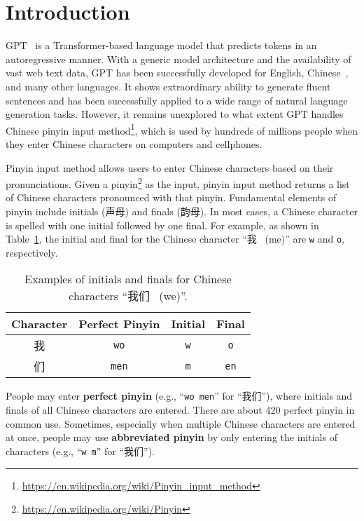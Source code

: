 \vspace{0.01cm}
\section{Introduction}
\label{sec:intro}
GPT~\cite{radford2018improving,radford2019language} is a Transformer-based \cite{vaswani2017attention} language model that predicts tokens in an autoregressive manner.
With a generic model architecture and the availability of vast web text data, GPT has been successfully developed for English, Chinese~\cite{GPT2-Chinese,cpm-v1}, and many other languages.
It shows extraordinary ability to generate fluent sentences and has been successfully applied to a wide range of natural language generation tasks.
However, it remains unexplored to what extent GPT handles Chinese pinyin input method\footnote{\url{https://en.wikipedia.org/wiki/Pinyin_input_method}}, 
which is used by hundreds of millions people when they enter Chinese characters on computers and cellphones.

Pinyin input method allows users to enter Chinese characters based on their pronunciations. 
Given a pinyin\footnote{\url{https://en.wikipedia.org/wiki/Pinyin}} as the input, pinyin input method returns a list of Chinese characters pronounced with that pinyin.
Fundamental elements of pinyin include initials (声母) and finals (韵母). In most cases, a Chinese character is spelled with one initial followed by one final.
For example, as shown in Table~\ref{tab:intro-example}, the initial and final for the Chinese character ``我 \ (me)''  are \texttt{w} and \texttt{o}, respectively.  
\begin{table}[t]
\centering
\begin{tabular}{c|c|c|c}
\toprule
\textbf{ Character} & \textbf{Perfect Pinyin} &\textbf{Initial} & \textbf{Final}\\
\midrule
我& \texttt{wo} & \texttt{w} & \texttt{o} \\
们& \texttt{men} & \texttt{m} & \texttt{en} \\
\bottomrule
\end{tabular}
\caption{Examples of initials and finals for Chinese characters ``我们 \ (we)''.}
\label{tab:intro-example}
\end{table}
People may enter \textbf{perfect pinyin} (e.g., ``\texttt{wo men}'' for ``我们''), where initials and finals of all Chinese characters are entered. 
There are about 420 perfect pinyin in common use.
Sometimes, especially when multiple Chinese characters are entered at once, people may use \textbf{abbreviated pinyin} by only entering the initials of characters (e.g.,  ``\texttt{w m}'' for ``我们'').


